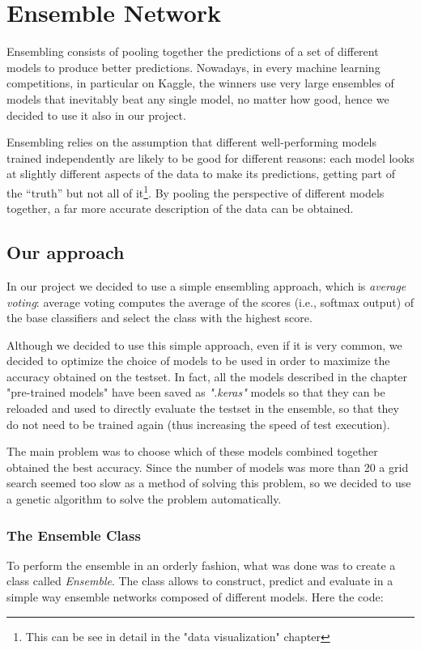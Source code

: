 \section{Ensemble Network}
 Ensembling consists of pooling together the predictions of a set of different models to produce better predictions. Nowadays, in every machine learning competitions, in particular on Kaggle, the winners use very large ensembles of models that inevitably beat any single model, no matter how good, hence we decided to use it also in our project.
 
 
Ensembling relies on the assumption that different well-performing models trained independently are likely to be good for different reasons: each model looks at slightly different aspects of the data to make its predictions, getting part of the “truth” but not all of it\footnote{This can be see in detail in the "data visualization" chapter}. By pooling the perspective of different models together, a far more accurate description of the data can be obtained.

\subsection{Our approach}
In our project we decided to use a simple ensembling approach, which is \textit{average voting}: average voting computes the average of the scores (i.e., softmax output) of the base classifiers and select the class with the highest score.

Although we decided to use this simple approach, even if it is very common, we decided to optimize the choice of models to be used in order to maximize the accuracy obtained on the testset. In fact, all the models described in the chapter "pre-trained models" have been saved as \textit{".keras"} models so that they can be reloaded and used to directly evaluate the testset in the ensemble, so that they do not need to be trained again (thus increasing the speed of test execution).

The main problem was to choose which of these models combined together obtained the best accuracy. Since the number of models was more than 20 a grid search seemed too slow as a method of solving this problem, so we decided to use a genetic algorithm to solve the problem automatically.




\subsubsection{The Ensemble Class}
To perform the ensemble in an orderly fashion, what was done was to create a class called \textit{Ensemble}. The class allows to construct, predict and evaluate in a simple way ensemble networks composed of different models. Here the code:

